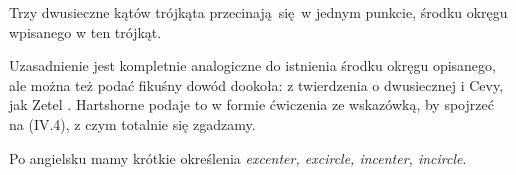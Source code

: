 \begin{proposition}
    Trzy dwusieczne kątów trójkąta przecinają się w jednym punkcie, środku okręgu wpisanego w ten trójkąt.
\end{proposition}

Uzasadnienie jest kompletnie analogiczne do istnienia środku okręgu opisanego, ale można też podać fikuśny dowód dookoła: z twierdzenia o dwusiecznej i Cevy, jak Zetel \cite[s. 14]{zetel_2020}.
Hartshorne \cite[s. 16]{hartshorne2000} podaje to w formie ćwiczenia ze wskazówką, by spojrzeć na (IV.4), z czym totalnie się zgadzamy.

Po angielsku mamy krótkie określenia \emph{excenter, excircle, incenter, incircle}.
